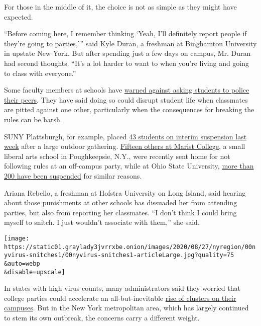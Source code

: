 For those in the middle of it, the choice is not as simple as they might
have expected.

``Before coming here, I remember thinking `Yeah, I'll definitely report
people if they're going to parties,''' said Kyle Duran, a freshman at
Binghamton University in upstate New York. But after spending just a few
days on campus, Mr. Duran had second thoughts. ``It's a lot harder to
want to when you're living and going to class with everyone.''

Some faculty members at schools have
\href{https://www.nytimes3xbfgragh.onion/2020/08/12/opinion/coronavirus-college-reopening.html}{warned
against asking students to police their peers}. They have said doing so
could disrupt student life when classmates are pitted against one other,
particularly when the consequences for breaking the rules can be harsh.

SUNY Plattsburgh, for example, placed
\href{https://www.plattsburgh.edu/news/news-archive/president-suspends-students-for-reported-covid-violations.html}{43
students on interim suspension last week} after a large outdoor
gathering.
\href{https://www.maristcircle.com/home/2020/8/22/fifteen-students-suspended-following-off-campus-party-wednesday}{Fifteen
others at Marist College}, a small liberal arts school in Poughkeepsie,
N.Y., were recently sent home for not following rules at an off-campus
party, while at Ohio State University,
\href{https://www.thelantern.com/2020/08/more-than-200-students-on-interim-suspension-after-weekend-parties/}{more
than 200 have been suspended} for similar reasons.

Ariana Rebello, a freshman at Hofstra University on Long Island, said
hearing about those punishments at other schools has dissuaded her from
attending parties, but also from reporting her classmates. ``I don't
think I could bring myself to snitch. I just wouldn't associate with
them,'' she said.

\texttt{[image: https://static01.graylady3jvrrxbe.onion/images/2020/08/27/nyregion/00nyvirus-snitches1/00nyvirus-snitches1-articleLarge.jpg?quality=75\\\&auto=webp\\\&disable=upscale]}

In states with high virus counts, many administrators said they worried
that college parties could accelerate an all-but-inevitable
\href{https://www.nytimes3xbfgragh.onion/interactive/2020/us/covid-college-cases-tracker.html?action=click\&module=Top\%20Stories\&pgtype=Homepage}{rise
of clusters on their campuses}. But in the New York metropolitan area,
which has largely continued to stem its own outbreak, the concerns carry
a different weight.

